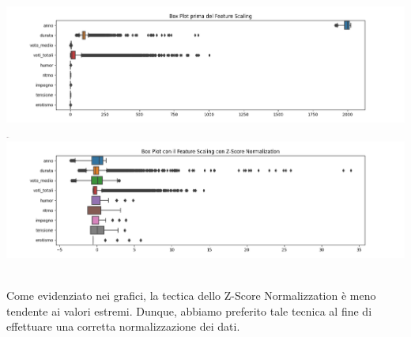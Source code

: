 \documentclass[a4paper, 10pt]{report}
\begin{document}
    \includegraphics[width=50cm]{dataPreparation/noScaling.png}
    \includegraphics[width=5]{dataPreparation/minMax.png}
    \includegraphics[width=50cm]{dataPreparation/zScore.png}

    \\Come evidenziato nei grafici, la tectica dello Z-Score Normalizzation è meno tendente ai valori estremi.
    Dunque, abbiamo preferito tale tecnica al fine di effettuare una corretta normalizzazione dei dati.
\end{document}
